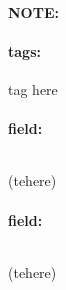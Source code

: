 \documentclass[12pt]{article}
\newenvironment{note}{\paragraph{NOTE:}}{}
\newenvironment{field}{\paragraph{field:}}{}
\newcommand*{\tags}[1]{\paragraph{tags: }#1}
\begin{document}
\begin{note}
    \tags{tag here}
    \begin{field}
    \[  

    \] 
    \begin{center}
    (te\thetat here)
    \end{center}
    \end{field}
    \begin{field}
    \[
 
    \] 
    \begin{center}
    (te\thetat here)
    \end{center}
    \end{field}
\end{note}
\end{document}
